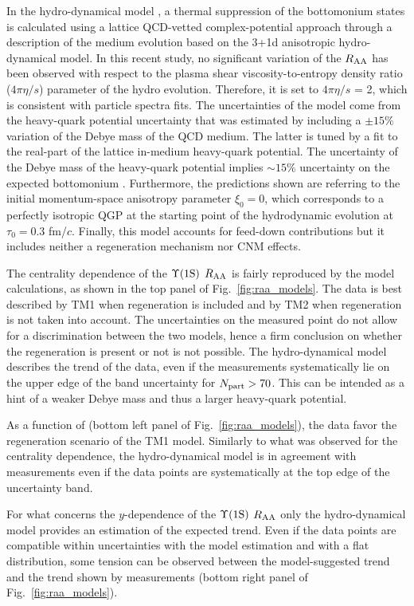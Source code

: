 In the hydro-dynamical model \cite{Krouppa:2017jlg}, a thermal suppression of the bottomonium states is calculated using a lattice QCD-vetted complex-potential approach through a description of the medium evolution based on the 3+1d anisotropic hydro-dynamical model.
 In this recent study, no significant variation of the $\mbox{$R_{\rm{AA}}$}$ has been observed with respect to the plasma shear viscosity-to-entropy density ratio ($4\pi\eta/s$) parameter of the hydro evolution. 
Therefore, it is set to $4\pi\eta/s$ = 2, which is consistent with particle spectra fits.
The uncertainties of the model come from the heavy-quark potential uncertainty that was estimated by including a $\pm 15\%$ variation of the Debye mass of the QCD medium.
The latter is tuned by a fit to the real-part of the lattice in-medium heavy-quark potential.
The uncertainty of the Debye mass of the heavy-quark potential implies $\sim15\%$ uncertainty on the expected bottomonium \raa. 
Furthermore, the predictions shown are referring to the initial momentum-space anisotropy parameter $\xi_0=0$, which corresponds to a perfectly isotropic QGP at the starting point of the hydrodynamic evolution at $\tau_0=0.3$ fm/$c$.
Finally, this model accounts for feed-down contributions but it includes neither a regeneration mechanism nor CNM effects. 

The centrality dependence of the $\mbox{$\Upsilon$(1S)}$ $\mbox{$R_{\rm{AA}}$}$ is fairly reproduced by the model calculations, as shown in the top panel of Fig.~\ref{fig:raa_models}.
The data is best described by TM1 when regeneration is included and by TM2 when regeneration is not taken into account.
The uncertainties on the measured point do not allow for a discrimination between the two models, hence a firm conclusion on whether the regeneration is present or not is not possible. 
The hydro-dynamical model describes the trend of the data, even if the measurements systematically lie on the upper edge of the band uncertainty for $\mbox{$N_{\rm{part}}$}>70$.
This can be intended as a hint of a weaker Debye mass and thus a larger heavy-quark potential.

As a function of \pt (bottom left panel of Fig.~\ref{fig:raa_models}), the data favor the regeneration scenario of the TM1 model.
Similarly to what was observed for the centrality dependence, the hydro-dynamical model is in agreement with measurements even if the data points are systematically at the top edge of the uncertainty band.

For what concerns the $y$-dependence of the $\mbox{$\Upsilon$(1S)}$ $\mbox{$R_{\rm{AA}}$}$ only the hydro-dynamical model provides an estimation of the expected trend.
Even if the data points are compatible within uncertainties with the model estimation and with a flat distribution, some tension can be observed between the model-suggested trend and the trend shown by measurements (bottom right panel of Fig.~\ref{fig:raa_models}).

